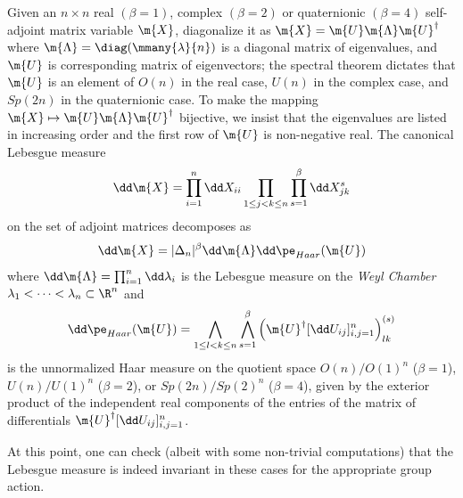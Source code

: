 \begin{proposicao}
	Given an $n\times n$ real $(\beta = 1)$, complex $(\beta = 2)$ or quaternionic $(\beta = 4)$ self-adjoint matrix variable $\m{X}$, diagonalize it as $\m{X} = \m{U} \m{\Lambda} \m{U}^{\dagger}$ where $\m{\Lambda} = \diag(\mmany{\lambda}{n})$ is a diagonal matrix of eigenvalues, and $\m{U}$ is corresponding matrix of eigenvectors; the spectral theorem dictates that $\m{U}$ is an element of $O(n)$ in the real case, $U(n)$ in the complex case, and $Sp(2n)$ in the quaternionic case. To make the mapping $\m{X} \mapsto \m{U}\m{\Lambda}\m{U}^{\dagger}$ bijective, we insist that the eigenvalues are listed in increasing order and the first row of $\m{U}$ is non-negative real. The canonical Lebesgue measure 
	\begin{equation}
		\dd \m{X} = \prod_{i=1}^{n} \dd X_{ii} \prod_{1\leq j < k \leq n} \prod_{s=1}^{\beta} \dd X^{s}_{jk}
	\end{equation}
	on the set of adjoint matrices decomposes as 
	\begin{equation}
		\dd \m{X} = |\Delta_n|^{\beta} \dd \m{\Lambda} \dd \pe_{Haar}(\m{U})
	\end{equation}
	where $\dd \m{\Lambda} = \prod_{i=1}^n \dd \lambda_i$ is the Lebesgue measure on the \textit{Weyl Chamber} ${\lambda_1 < \cdots < \lambda_n} \subset \R^n$ and
	\begin{equation}
		\dd \pe_{Haar}(\m{U}) = \bigwedge_{1\leq l < k \leq n} \bigwedge_{s=1}^\beta \left( \m{U}^{\dagger} [\dd U_{ij}]_{i,j=1}^n \right)_{lk}^{(s)}
	\end{equation}
	is the unnormalized Haar measure on the quotient space $O(n)/O(1)^n$ ($\beta = 1$), $U(n)/U(1)^n$ ($\beta = 2$), or $Sp(2n)/Sp(2)^n$ ($\beta = 4$), given by the exterior product of the independent real components of the entries of the matrix of differentials $\m{U}^{\dagger} [\dd U_{ij}]_{i,j=1}^n$.
\end{proposicao}

At this point, one can check (albeit with some non-trivial computations) that the Lebesgue measure is indeed invariant in these cases for the appropriate group action. 

